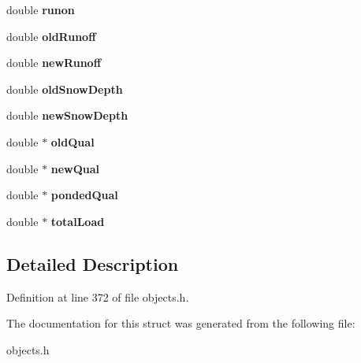 \begin{DoxyCompactItemize}
double {\bfseries runon}
\item 
\mbox{\label{struct_t_subcatch_a6af4ec37ecf06a0fb467662d1b7f2f42}} 
double {\bfseries old\+Runoff}
\item 
\mbox{\label{struct_t_subcatch_a6adbd17ac6bc25e758905f4fcbcbe7d1}} 
double {\bfseries new\+Runoff}
\item 
\mbox{\label{struct_t_subcatch_ac21121c7e5ba122d8232ac9362e0a165}} 
double {\bfseries old\+Snow\+Depth}
\item 
\mbox{\label{struct_t_subcatch_a29c671edcc236641920872d0ddd61cd1}} 
double {\bfseries new\+Snow\+Depth}
\item 
\mbox{\label{struct_t_subcatch_a2021ab3e0d06d6461e9a6c734c476edd}} 
double $\ast$ {\bfseries old\+Qual}
\item 
\mbox{\label{struct_t_subcatch_ab4755cc5f84d582feddddc026135b667}} 
double $\ast$ {\bfseries new\+Qual}
\item 
\mbox{\label{struct_t_subcatch_aac35f7f4d2bb1d837a97ecac6ba2ff69}} 
double $\ast$ {\bfseries ponded\+Qual}
\item 
\mbox{\label{struct_t_subcatch_ae3d8bf0ee03b205afb121782c4664ba8}} 
double $\ast$ {\bfseries total\+Load}
\end{DoxyCompactItemize}


\subsection{Detailed Description}


Definition at line 372 of file objects.\+h.



The documentation for this struct was generated from the following file\+:\begin{DoxyCompactItemize}
\item 
objects.\+h\end{DoxyCompactItemize}
